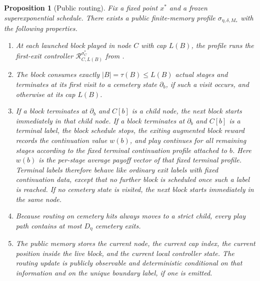\documentclass[12pt]{article}
\newtheorem{proposition}[theorem]{Proposition}
\theoremstyle{definition}
\newcommand{\1}{\mathbf{1}}
\begin{document}
\begin{proposition}[Public routing]
\label{prop:public-routing}
Fix a fixed point $x^*$ and a frozen superexponential schedule. There exists a
public finite-memory profile $\sigma_{\eta,\delta,M_*}$ with the following
properties.
\begin{enumerate}[label=\textnormal{(R\arabic*)},leftmargin=2.8em]
\item At each launched block played in node $C$ with cap $L(B)$, the profile runs
the first-exit controller $\mathcal R_{C,L(B)}^{\sigma_C^*}$ from
.
\item The block consumes exactly $|B|=\tau(B)\le L(B)$ actual stages and
terminates at its first visit to a cemetery state $\partial_b$, if such a visit
occurs, and otherwise at its cap $L(B)$.
\item If a block terminates at $\partial_b$ and $C[b]$ is a child node, the next
block starts immediately in that child node. If a block terminates at
$\partial_b$ and $C[b]$ is a terminal label, the block schedule stops, the
exiting augmented block reward records the continuation value $w(b)$, and play
continues for all remaining stages according to the fixed terminal continuation
profile attached to $b$. Here $w(b)$ is the per-stage average payoff vector of
that fixed terminal profile. Terminal labels therefore behave like ordinary exit
labels with fixed continuation data, except that no further block is scheduled
once such a label is reached. If no cemetery state is visited, the next block
starts immediately in the same node.
\item Because routing on cemetery hits always moves to a strict child, every play
path contains at most $D_\eta$ cemetery exits.
\item The public memory stores the current node, the current cap index, the
current position inside the live block, and the current local controller state.
The routing update is publicly observable and deterministic conditional on that
information and on the unique boundary label, if one is emitted.
\end{enumerate}
\end{proposition}
\end{document}
